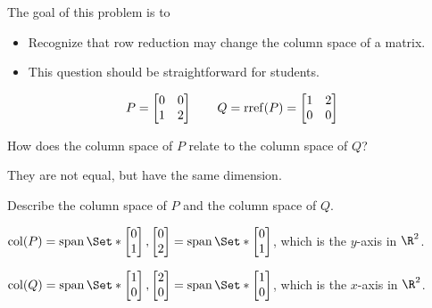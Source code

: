 	\bookonlynewpage
	\question
	\begin{annotation}
		\begin{goals}

			The goal of this problem is to
			\begin{itemize}
				\item Recognize that row reduction may change the column space of a matrix.
			\end{itemize}
		\end{goals}

		\begin{notes}
			\begin{itemize}
				\item This question should be straightforward for students.
			\end{itemize}
		\end{notes}
	\end{annotation}
	\[
		P=\mat{0&0\\1&2}\qquad Q=\rref(P)=\mat{1&2\\0&0}
	\]
	\begin{parts}
		\item How does the column space of $P$ relate to the column space of $Q$?
			\begin{solution}
				They are not equal, but have the same dimension.
			\end{solution}
		\item Describe the column space of $P$ and the column space of $Q$.
			\begin{solution}
				$\Col(P)=\Span\Set*{\mat{0\\1},\mat{0\\2}}=\Span\Set*{\mat{0\\1}}$,
				which is the $y$-axis in $\R^2$.

				$\Col(Q)=\Span\Set*{\mat{1\\0},\mat{2\\0}}=\Span\Set*{\mat{1\\0}}$,
				which is the $x$-axis in $\R^2$.
			\end{solution}
	\end{parts}


